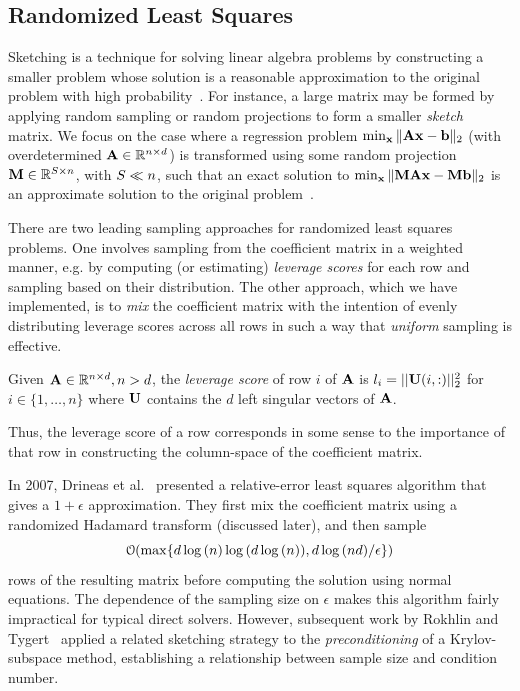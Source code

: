 \subsection{Randomized Least Squares}
\label{sec:sketching}
Sketching is a technique for solving linear algebra problems by constructing 
a smaller problem whose solution is a 
reasonable approximation to the original problem with high probability~\cite{sketching}. 
For instance, a large matrix may be formed by applying random sampling or random 
projections to form a smaller \emph{sketch} matrix. 
We focus on the case where a regression
problem $\min_{\V{x}}\| \M{A}\V{x} - \V{b} \|_2$ (with overdetermined
$\M{A} \in \mathbb{R}^{n\times d}$) is transformed using some random
projection $\M{M} \in \mathbb{R}^{\samplesize\times n}$, with $S\ll
n$, such that an exact solution to $\min_{\V{x}}\| \M{M}\M{A}\V{x} -
\M{M}\V{b} \|_2$ is an approximate solution to the original
problem~\cite{rokhlintygert,DrMaMuSa11,blendenpik}.


There are two leading sampling approaches for randomized least squares
problems. One involves sampling from the coefficient matrix in a
weighted manner, e.g. by computing (or estimating) \emph{leverage
  scores} for each row and sampling based on their distribution. The
other approach, which we have implemented, is to \emph{mix} the
coefficient matrix with the intention of evenly distributing leverage scores
across all rows in such a way that \emph{uniform} sampling is
effective. 
\begin{definition}
Given $\M{A} \in \mathbb{R}^{n\times d}, n > d$, the \emph{leverage score} of row $i$ of $\M{A}$ is $l_i = ||\M{U}(i,:)||_2^2$
for $i \in \{1,\dots ,n\}$ where $\M{U}$ contains the $d$ left singular vectors of $\M{A}$.
\end{definition}
Thus, the leverage score of a row corresponds in some sense to the
importance of that row in constructing the column-space of the
coefficient matrix. 

In 2007, Drineas et al.~\cite{DrMaMuSa11} presented a relative-error
least squares algorithm that gives a $1 + \epsilon$
approximation. They first mix the coefficient matrix using a
randomized Hadamard transform (discussed later), and then sample 
\begin{equation}
\label{eqn:numsamples}
\mathcal{O}\hspace{-.2em}\left({\max\{ d\log{(n)}\log{(d\log{(n)})}, d\log{(nd)}/\epsilon\}}\right)
\end{equation}
rows of the resulting matrix before computing the solution using
normal equations. The dependence of the sampling size on $\epsilon$
makes this algorithm fairly impractical for typical direct
solvers. However, subsequent work by Rokhlin and
Tygert~\cite{rokhlintygert} applied a related sketching strategy to
the \emph{preconditioning} of a Krylov-subspace method, establishing a
relationship between sample size and condition number.  

